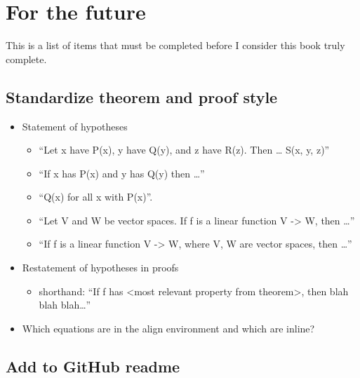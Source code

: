 \chapter*{For the future}

This is a list of items that must be completed before I consider this book truly complete.

\section*{Standardize theorem and proof style}

\begin{itemize}
    \item Statement of hypotheses
    \begin{itemize}
        \item “Let x have P(x), y have Q(y), and z have R(z). Then … S(x, y, z)”
        \item “If x has P(x) and y has Q(y) then …”
        \item “Q(x) for all x with P(x)”.
        \item “Let V and W be vector spaces. If f is a linear function V -> W, then …”
        \item “If f is a linear function V -> W, where V, W are vector spaces, then …”
    \end{itemize}
    \item Restatement of hypotheses in proofs
    \begin{itemize}
        \item shorthand: “If f has <most relevant property from theorem>, then blah blah blah…” 
    \end{itemize}
    \item Which equations are in the align environment and which are inline?
\end{itemize}

\section*{Add to GitHub readme}

